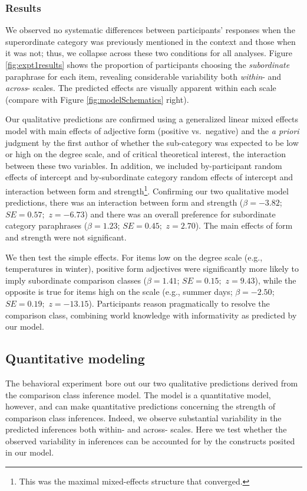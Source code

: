 \documentclass[doc]{apa6}
\begin{document}
\subsubsection{Results}

We observed no systematic differences between participants' responses when the superordinate category was previously mentioned in the context and those when it was not; thus, we collapse across these two conditions for all analyses. Figure \ref{fig:expt1results} shows the proportion of participants choosing the \emph{subordinate} paraphrase for each item, revealing considerable variability both \emph{within}- and \emph{across}- scales. The predicted effects are visually apparent within each scale (compare with Figure \ref{fig:modelSchematics} right).

Our qualitative predictions are confirmed using a generalized linear mixed effects model with main effects of adjective form (positive vs.~negative) and the \emph{a priori} judgment by the first author of whether the sub-category was expected to be low or high on the degree scale, and of critical theoretical interest, the interaction between these two variables. In addition, we included by-participant random effects of intercept and by-subordinate category random effects of intercept and interaction between form and strength\footnote{This was the maximal mixed-effects structure that converged.}. Confirming our two qualitative model predictions, there was an interaction between form and strength (\(\beta = -3.82\); \(SE = 0.57;\) \(z = -6.73\)) and there was an overall preference for subordinate category paraphrases (\(\beta = 1.23\); \(SE = 0.45;\) \(z = 2.70\)). The main effects of form and strength were not significant.

We then test the simple effects. For items low on the degree scale (e.g., temperatures in winter), positive form adjectives were significantly more likely to imply subordinate comparison classes (\(\beta = 1.41\); \(SE = 0.15;\) \(z = 9.43\)), while the opposite is true for items high on the scale (e.g., summer days; \(\beta = -2.50\); \(SE = 0.19;\) \(z = -13.15\)). Participants reason pragmatically to resolve the comparison class, combining world knowledge with informativity as predicted by our model.

\subsection{Quantitative modeling}

The behavioral experiment bore out our two qualitative predictions derived from the comparison class inference model. The model is a quantitative model, however, and can make quantitative predictions concerning the strength of comparison class inferences. Indeed, we observe substantial variability in the predicted inferences both within- and across- scales. Here we test whether the observed variability in inferences can be accounted for by the constructs posited in our model. 
\end{document}
